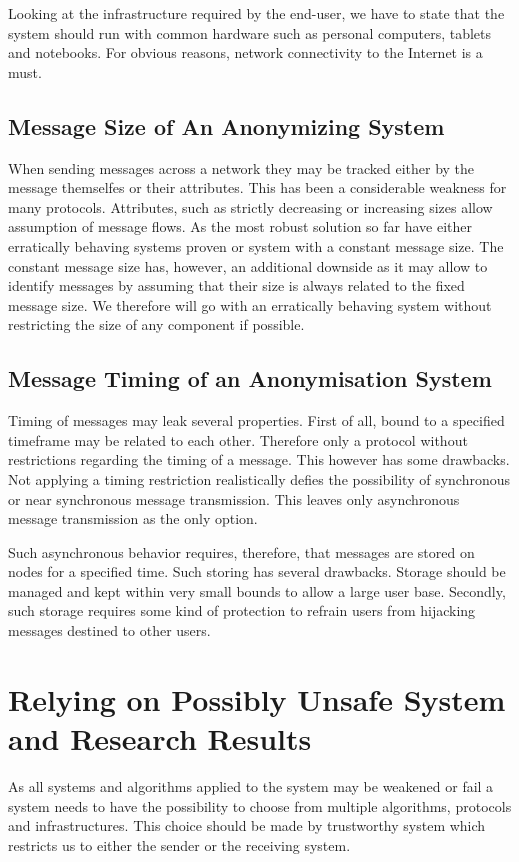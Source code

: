 Looking at the infrastructure required by the end-user, we have to state that the system should run with common hardware such as personal computers, tablets and notebooks. For obvious reasons, network connectivity to the Internet is a must.

\subsection{Message Size of An Anonymizing System}
When sending messages across a network they may be tracked either by the message themselfes or their attributes. This has been  a considerable weakness for many protocols. Attributes, such as strictly decreasing or increasing sizes allow assumption of message flows. As the most robust solution so far have either erratically behaving systems proven or system with a constant message size. The constant message size has, however, an additional downside as it may allow to identify messages by assuming that their size is always related to the fixed message size. We therefore will go with an erratically behaving system without restricting the size of any component if possible.

\subsection{Message Timing of an Anonymisation System}
Timing of messages may leak several properties. First of all, bound to a specified timeframe may be related to each other. Therefore only a protocol without restrictions regarding the timing of a message. This however has some drawbacks. Not applying a timing restriction realistically defies the possibility of synchronous or near synchronous message transmission. This leaves only asynchronous message transmission as the only option.

Such asynchronous behavior requires, therefore, that messages are stored on nodes for a specified time. Such storing has several drawbacks. Storage should be managed and kept within very small bounds to allow a large user base. Secondly, such storage requires some kind of protection to refrain users from hijacking messages destined to other users.

\section{Relying on Possibly Unsafe System and Research Results}
As all systems and algorithms applied to the system may be weakened or fail a system needs to have the possibility to choose from multiple algorithms, protocols and infrastructures. This choice should be made by trustworthy system which restricts us to either the sender or the receiving system.

